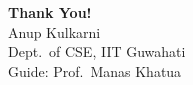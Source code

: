 \section*{}

\begin{frame}
    \begin{center}
        \Huge \textbf{Thank You!} \\[1.5em]
        \normalsize Anup Kulkarni \\
        \small Dept.\ of CSE, IIT Guwahati \\
        \small Guide: Prof.\ Manas Khatua
    \end{center}
\end{frame}
